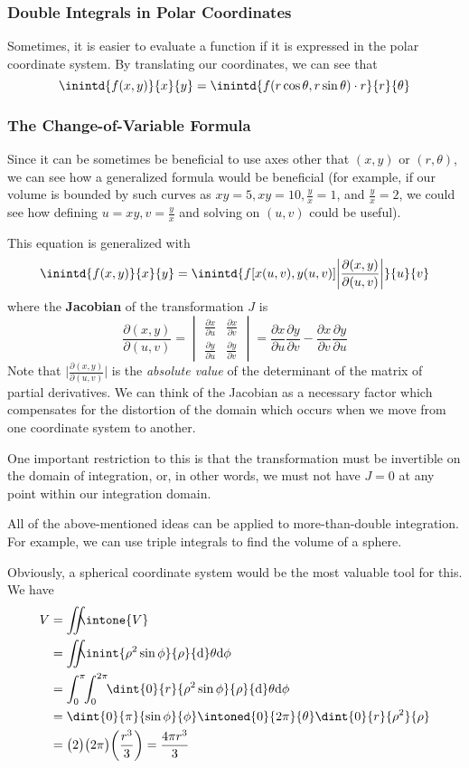 \documentclass[12pt]{article}
\begin{document}
\subsubsection*{Double Integrals in Polar Coordinates}
Sometimes, it is easier to evaluate a function if it is expressed in the polar coordinate system. By translating our coordinates, we can see that \[ \inintd{f(x,y)}{x}{y} = \inintd{f(r\cos\theta, r\sin\theta)\cdot r}{r}{\theta} \]

\subsubsection*{The Change-of-Variable Formula}
Since it can be sometimes be beneficial to use axes other that $(x,y)$ or $(r,\theta)$, we can see how a generalized formula would be beneficial (for example, if our volume is bounded by such curves as $xy = 5, xy = 10, \frac{y}{x} = 1$, and $\frac{y}{x} = 2$, we could see how defining $u = xy, v = \frac{y}{x}$ and solving on $(u,v)$ could be useful).

This equation is generalized with \[ \inintd{f(x,y)}{x}{y} = \inintd{f[x(u,v),y(u,v)] \bigg|\frac{\partial (x,y)}{\partial (u,v)}\bigg|}{u}{v} \] where the {\bf Jacobian} of the transformation $J$ is \[ \frac{\partial (x,y)}{\partial (u,v)} = \begin{vmatrix}\frac{\partial x}{\partial u} & \frac{\partial x}{\partial v} \\ \frac{\partial y}{\partial u} & \frac{\partial y}{\partial v}\end{vmatrix} = \frac{\partial x}{\partial u}\frac{\partial y}{\partial v} - \frac{\partial x}{\partial v}\frac{\partial y}{\partial u} \] Note that $\bigg|\frac{\partial (x,y)}{\partial (u,v)}\bigg|$ is the \emph{absolute value} of the determinant of the matrix of partial derivatives. We can think of the Jacobian as a necessary factor which compensates for the distortion of the domain which occurs when we move from one coordinate system to another.

One important restriction to this is that the transformation must be invertible on the domain of integration, or, in other words, we must not have $J = 0$ at any point within our integration domain.

All of the above-mentioned ideas can be applied to more-than-double integration. For example, we can use triple integrals to find the volume of a sphere.

Obviously, a spherical coordinate system would be the most valuable tool for this. We have
\begin{align*}
V &= \int\!\!\!\!\int\!\!\!\!\intone{V}\\
  &= \int\!\!\!\!\int\!\!\!\!\inint{\rho^2 \sin\phi}{\rho}{\rm d}\theta{\rm d}\phi\\
  &= \int_0^\pi\!\! \int_0^{2\pi}\!\! \dint{0}{r}{\rho^2 \sin\phi}{\rho}{\rm d}\theta{\rm d}\phi\\
  &= \dint{0}{\pi}{\sin\phi}{\phi} \intoned{0}{2\pi}{\theta} \dint{0}{r}{\rho^2}{\rho}\\
  &= \bigl(2\bigl) \bigl(2\pi\bigl) \bigg(\frac{r^3}{3}\bigg) = \frac{4\pi r^3}{3}
\end{align*}
\end{document}
